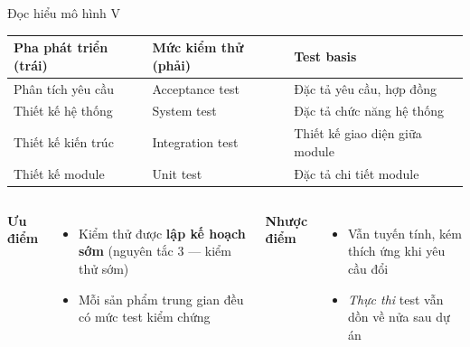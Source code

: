 \documentclass[aspectratio=169,12pt]{beamer}
\begin{document}
\begin{frame}{Đọc hiểu mô hình V}
  \begin{center}
  \small
  \begin{tabular}{lll}
    \toprule
    \textbf{Pha phát triển (trái)} & \textbf{Mức kiểm thử (phải)} & \textbf{Test basis} \\
    \midrule
    Phân tích yêu cầu   & Acceptance test   & Đặc tả yêu cầu, hợp đồng \\
    Thiết kế hệ thống   & System test       & Đặc tả chức năng hệ thống \\
    Thiết kế kiến trúc  & Integration test  & Thiết kế giao diện giữa module \\
    Thiết kế module     & Unit test         & Đặc tả chi tiết module \\
    \bottomrule
  \end{tabular}
  \end{center}

  \vspace{0.4em}
  \begin{columns}[T]
    \textbf{Ưu điểm}
    \begin{itemize}
      \item Kiểm thử được \textbf{lập kế hoạch sớm} (nguyên tắc 3 --- kiểm thử sớm)
      \item Mỗi sản phẩm trung gian đều có mức test kiểm chứng
    \end{itemize}
    \textbf{Nhược điểm}
    \begin{itemize}
      \item Vẫn tuyến tính, kém thích ứng khi yêu cầu đổi
      \item \textit{Thực thi} test vẫn dồn về nửa sau dự án
    \end{itemize}
  \end{columns}
\end{frame}
\end{document}
